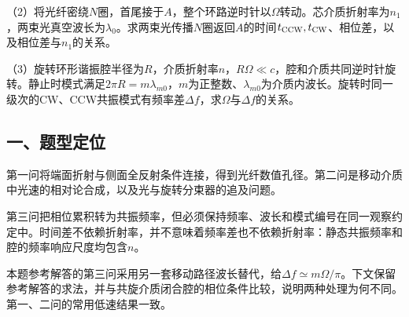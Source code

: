 \documentclass[12pt,a4paper,fontset=fandol]{ctexart}
\begin{document}
\begin{center}
\begin{minipage}{\linewidth}
\centering\begingroup{}
\ifdim\wd\diagrambox>.88\linewidth
\sbox{\diagrambox}{\resizebox{.88\linewidth}{!}{\usebox{\diagrambox}}}\fi
\ifdim\ht\diagrambox>.38\textheight
\resizebox{!}{.38\textheight}{\usebox{\diagrambox}}
\else\usebox{\diagrambox}\fi
\par{}\endgroup\end{minipage}\end{center}

（2）将光纤密绕\(N\)圈，首尾接于\(A\)，整个环路逆时针以\(\Omega\)转动。芯介质折射率为\(n_1\)，两束光真空波长为\(\lambda_0\)。求两束光传播\(N\)圈返回\(A\)的时间\(t_{\rm CCW},t_{\rm CW}\)、相位差，以及相位差与\(n_1\)的关系。

（3）旋转环形谐振腔半径为\(R\)，介质折射率\(n\)，\(R\Omega\ll c\)，腔和介质共同逆时针旋转。静止时模式满足\(2\pi R=m\lambda_{m0}\)，\(m\)为正整数、\(\lambda_{m0}\)为介质内波长。旋转时同一级次的CW、CCW共振模式有频率差\(\Delta f\)，求\(\Omega\)与\(\Delta f\)的关系。

\subsection{一、题型定位}\label{ux4e00ux9898ux578bux5b9aux4f4d-5}

第一问将端面折射与侧面全反射条件连接，得到光纤数值孔径。第二问是移动介质中光速的相对论合成，以及光与旋转分束器的追及问题。

第三问把相位累积转为共振频率，但必须保持频率、波长和模式编号在同一观察约定中。时间差不依赖折射率，并不意味着频率差也不依赖折射率：静态共振频率和腔的频率响应尺度均包含\(n\)。

本题参考解答的第三问采用另一套移动路径波长替代，给\(\Delta f\simeq m\Omega/\pi\)。下文保留参考解答的求法，并与共旋介质闭合腔的相位条件比较，说明两种处理为何不同。第一、二问的常用低速结果一致。
\end{document}
